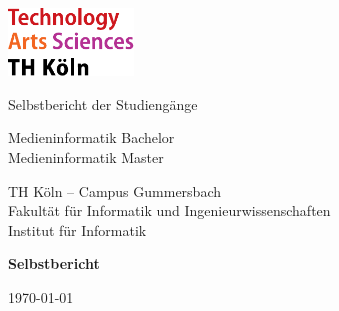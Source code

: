 
\begin{titlepage}

	\includegraphics[width=0.25\textwidth]{../../../assets/logo_th_koeln.pdf}

	\vspace{2cm}
	{\Large\raggedright Selbstbericht der Studiengänge\par}
	\vspace{-1cm}
	{\Huge\singlespacing Medieninformatik Bachelor \\ Medieninformatik Master \par}
	\vspace{1cm}
	{\Large TH Köln – Campus Gummersbach \\ Fakultät für Informatik und Ingenieurwissenschaften \\ Institut für Informatik\par}
	\vspace{1.5cm}
	{\huge\bfseries Selbstbericht\par}

	\vfill

	{\large \today\par}
\end{titlepage}
